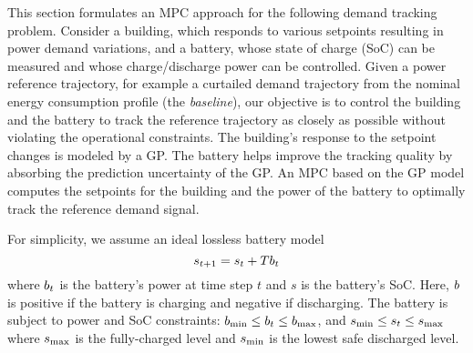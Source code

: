 This section formulates an MPC approach for the following demand tracking problem.
Consider a building, which responds to various setpoints resulting in power demand variations, and a battery, whose state of charge (SoC) can be measured and whose charge/discharge power can be controlled.
Given a power reference trajectory, for example a curtailed demand trajectory from the nominal energy consumption profile (the \emph{baseline}), our objective is to control the building and the battery to track the reference trajectory as closely as possible without violating the operational constraints.
The building's response to the setpoint changes is modeled by a GP.
The battery helps improve the tracking quality by absorbing the prediction uncertainty of the GP.
An MPC based on the GP model computes the setpoints for the building and the power of the battery to optimally track the reference demand signal.

For simplicity, we assume an ideal lossless battery model
\begin{equation}
\label{eq:battery-model}
s_{t+1} = s_t + T \Pbatt_t
\end{equation}
where \(b_t\) is the battery's power at time step \(t\) and \(s\) is the battery's SoC.
Here, \(b\) is positive if the battery is charging and negative if discharging.
The battery is subject to power and SoC constraints:
\(b_{\mathrm{min}} \leq b_t \leq b_{\mathrm{max}}\), 
and \(s_{\mathrm{min}} \leq s_t \leq s_{\mathrm{max}}\) where \(s_{\mathrm{max}}\) is the fully-charged level and \(s_{\mathrm{min}}\) is the lowest safe discharged level. 

